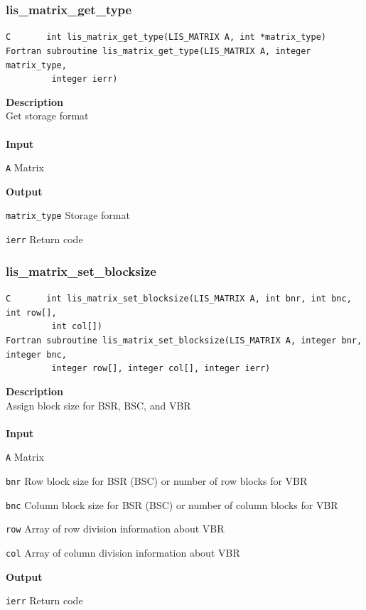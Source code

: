 \documentclass[a4paper]{article}
\newcommand{\namelistlabel}[1]{\mbox{#1}\hfill}
\newenvironment{namelist}[1]{%
 \begin{list}{}
  {\let\makelabel\namelistlabel
  \settowidth{\labelwidth}{#1}
  \setlength{\leftmargin}{1.1\labelwidth}}
}{%
\end{list}}
\begin{document}
  \subsubsection{lis\_matrix\_get\_type}
\begin{screen}
\verb|C       int lis_matrix_get_type(LIS_MATRIX A, int *matrix_type)|
\verb|Fortran subroutine lis_matrix_get_type(LIS_MATRIX A, integer matrix_type,|\\
\verb|         integer ierr)|
\end{screen}
{\bf Description}\\
\indent
Get storage format
\\ \\
\noindent
{\bf Input}
\begin{namelist}{XXXXXXXXXXXXXXXXXXXX}
\item[\tt A] Matrix
\end{namelist}
{\bf Output}
\begin{namelist}{XXXXXXXXXXXXXXXXXXXX}
\item[\tt matrix\_type] Storage format
\item[\tt ierr] Return code
\end{namelist}
  \subsubsection{lis\_matrix\_set\_blocksize}
\begin{screen}
\verb|C       int lis_matrix_set_blocksize(LIS_MATRIX A, int bnr, int bnc, int row[],|\\
\verb|         int col[])|\\
\verb|Fortran subroutine lis_matrix_set_blocksize(LIS_MATRIX A, integer bnr, integer bnc,|\\
\verb|         integer row[], integer col[], integer ierr)|
\end{screen}
{\bf Description}\\
\indent
Assign block size for BSR, BSC, and VBR
\\ \\
\noindent
{\bf Input}
\begin{namelist}{XXXXXXXXXXXXXXXXXXXX}
\item[\tt A] Matrix
\item[\tt bnr] Row block size for BSR (BSC) or number of row blocks for VBR
\item[\tt bnc] Column block size for BSR (BSC) or number of column blocks for VBR
\item[\tt row] Array of row division information about VBR
\item[\tt col] Array of column division information about VBR
\end{namelist}
{\bf Output}
\begin{namelist}{XXXXXXXXXXXXXXXXXXXX}
\item[\tt ierr] Return code
\end{namelist}
\end{document}
